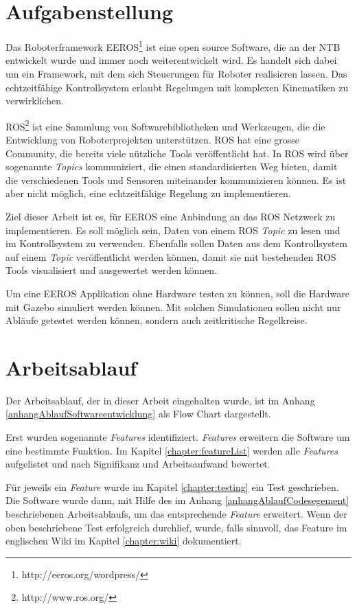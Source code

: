 \section{Aufgabenstellung}
Das Roboterframework EEROS\footnote{http://eeros.org/wordpress/} ist eine open source Software, die an der NTB entwickelt wurde und immer noch weiterentwickelt wird.
Es handelt sich dabei um ein Framework, mit dem sich Steuerungen für Roboter realisieren lassen.
Das echtzeitfähige Kontrollsystem erlaubt Regelungen mit komplexen Kinematiken zu verwirklichen.

ROS\footnote{http://www.ros.org/} ist eine Sammlung von Softwarebibliotheken und Werkzeugen, die die Entwicklung von Roboterprojekten unterstützen.
ROS hat eine grosse Community, die bereits viele nützliche Tools veröffentlicht hat.
In ROS wird über sogenannte \textit{Topics} kommuniziert, die einen standardisierten Weg bieten, damit die verschiedenen Tools und Sensoren miteinander kommunizieren können.
Es ist aber nicht möglich, eine echtzeitfähige Regelung zu implementieren.

Ziel dieser Arbeit ist es, für EEROS eine Anbindung an das ROS Netzwerk zu implementieren.
Es soll möglich sein, Daten von einem ROS \textit{Topic} zu lesen und im Kontrollsystem zu verwenden.
Ebenfalls sollen Daten aus dem Kontrollsystem auf einem \textit{Topic} veröffentlicht werden können, damit sie mit bestehenden ROS Tools visualisiert und ausgewertet werden können.

Um eine EEROS Applikation ohne Hardware testen zu können, soll die Hardware mit Gazebo simuliert werden können.
Mit solchen Simulationen sollen nicht nur Abläufe getestet werden können, sondern auch zeitkritische Regelkreise.


\section{Arbeitsablauf}
Der Arbeitsablauf, der in dieser Arbeit eingehalten wurde, ist im Anhang \ref{anhangAblaufSoftwareentwicklung} als Flow Chart dargestellt.

Erst wurden sogenannte \textit{Features} identifiziert.
\textit{Features} erweitern die Software um eine bestimmte Funktion.
Im Kapitel \ref{chapter:featureList} werden alle \textit{Features} aufgelistet und nach Signifikanz und Arbeitsaufwand bewertet.

Für jeweils ein \textit{Feature} wurde im Kapitel \ref{chapter:testing} ein Test geschrieben.
Die Software wurde dann, mit Hilfe des im Anhang \ref{anhangAblaufCodesegement} beschriebenen Arbeitsablaufs, um das entsprechende \textit{Feature} erweitert.
Wenn der oben beschriebene Test erfolgreich durchlief, wurde, falls sinnvoll, das Feature im englischen Wiki im Kapitel \ref{chapter:wiki} dokumentiert.

